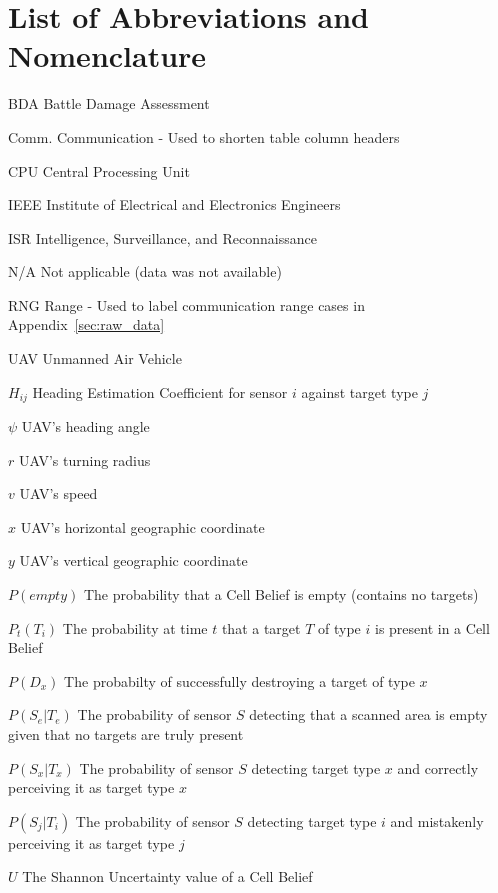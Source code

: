 \chapter*{List of Abbreviations and Nomenclature}
\begin{abbrv}
\item[BDA]				Battle Damage Assessment
\item[Comm.]            Communication - Used to shorten table column headers
\item[CPU]				Central Processing Unit
\item[IEEE]				Institute of Electrical and Electronics Engineers
\item[ISR]              Intelligence, Surveillance, and Reconnaissance
\item[N/A]              Not applicable (data was not available)
\item[RNG]              Range - Used to label communication range cases in Appendix~\ref{sec:raw_data}
\item[UAV]				Unmanned Air Vehicle
\item[$H_{ij}$] 		Heading Estimation Coefficient for sensor $i$ against target type $j$
\item[$\psi$]           UAV's heading angle
\item[$r$]              UAV's turning radius
\item[$v$] 				UAV's speed
\item[$x$]			    UAV's horizontal geographic coordinate
\item[$y$]			    UAV's vertical geographic coordinate
\item[$P(empty)$] 		The probability that a Cell Belief is empty (contains no targets)
\item[$P_{t}(T_{i})$]   The probability at time $t$ that a target $T$ of type $i$ is present in a Cell Belief
\item[$P(D_{x})$]       The probabilty of successfully destroying a target of type $x$
\item[$P(S_{e}|T_{e})$] The probability of sensor $S$ detecting that a scanned area is empty given that no targets are truly present
\item[$P(S_{x}|T_{x})$] The probability of sensor $S$ detecting target type $x$ and correctly perceiving it as target type $x$
\item[$P(S_{j}|T_{i})$] The probability of sensor $S$ detecting target type $i$ and mistakenly perceiving it as target type $j$
\item[$U$]              The Shannon Uncertainty value of a Cell Belief
\end{abbrv}